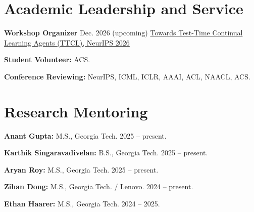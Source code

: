 \section{Academic Leadership and Service}
\CVHeading
  {\textbf{Workshop Organizer}}
  {Dec. 2026 (upcoming)}
\href{https://ttcl-agents.github.io/}{Towards Test-Time Continual Learning
Agents (TTCL), NeurIPS 2026}\par
\vspace{5.5pt}
\textbf{Student Volunteer:} ACS.\par
\vspace{2.2pt}
\textbf{Conference Reviewing:} NeurIPS, ICML, ICLR, AAAI, ACL, NAACL, ACS.

\section{Research Mentoring}
\textbf{Anant Gupta:} M.S., Georgia Tech. 2025 -- present.\par
\textbf{Karthik Singaravadivelan:} B.S., Georgia Tech. 2025 -- present.\par
\textbf{Aryan Roy:} M.S., Georgia Tech. 2025 -- present.\par
\textbf{Zihan Dong:} M.S., Georgia Tech. / Lenovo. 2024 -- present.\par
\textbf{Ethan Haarer:} M.S., Georgia Tech. 2024 -- 2025.
